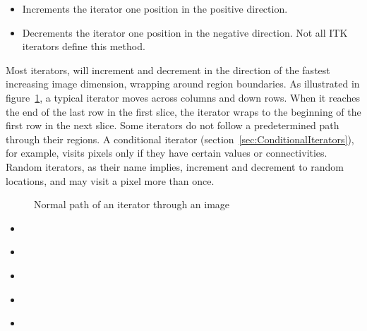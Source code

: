 \begin{itemize}
\item \textbf{} Increments the iterator one position in the
positive direction.

\item \textbf{} Decrements the iterator one position in the
negative direction.  Not all ITK iterators define this method.
\end{itemize}

Most iterators, will increment and decrement in the direction of the fastest
increasing image dimension, wrapping around region boundaries.  As illustrated
in figure~{\ref{fig:WalkingIterator}}, a typical iterator moves across columns
and down rows.  When it reaches the end of the last row in the first slice, the
iterator wraps to the beginning of the first row in the next slice.  Some
iterators do not follow a predetermined path through their regions.  A
conditional iterator (section~\ref{sec:ConditionalIterators}), for example,
visits pixels only if they have certain values or connectivities.  Random
iterators, as their name implies, increment and decrement to random locations,
and may visit a pixel more than once.

\begin{figure}
\centering
\caption[Normal iterator path.]{Normal path of an iterator through an image}
\protect\label{fig:WalkingIterator}
\end{figure}


\begin{itemize}
\item \textbf{} 
\item \textbf{}
\end{itemize}


\begin{itemize}
\item \textbf{}
\item \textbf{}
\end{itemize}


\begin{itemize}
\item \textbf{}
\end{itemize}

